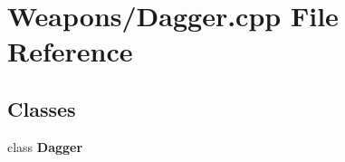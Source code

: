 \section{Weapons/\-Dagger.cpp File Reference}
\label{_dagger_8cpp}
\subsection*{Classes}
\begin{DoxyCompactItemize}
\item 
class {\bf Dagger}
\end{DoxyCompactItemize}
